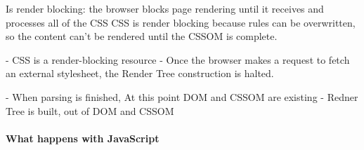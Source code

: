 Is render blocking: the browser blocks page rendering until it receives and processes all of the CSS
CSS is render blocking because rules can be overwritten, so the content can't be rendered until the CSSOM is complete.

- CSS is a render-blocking resource
- Once the browser makes a request to fetch an external stylesheet, the Render Tree construction is halted.





- When parsing is finished, At this point DOM and CSSOM are existing
- Redner Tree is built, out of DOM and CSSOM




















\paragraph{What happens with JavaScript}





